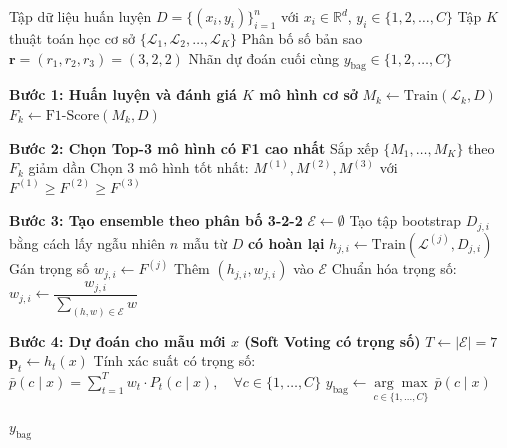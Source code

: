 
\begin{algorithm}[htbp]
\caption{Thuật toán Hybrid Bagging Ensemble Learning}
\label{bagging_ag}
\begin{algorithmic}[1]
\Require Tập dữ liệu huấn luyện $D = \{(x_i, y_i)\}_{i=1}^{n}$ với $x_i \in \mathbb{R}^d$, $y_i \in \{1, 2, \dots, C\}$
\Statex \qquad Tập $K$ thuật toán học cơ sở $\{\mathcal{L}_1, \mathcal{L}_2, \dots, \mathcal{L}_K\}$
\Statex \qquad Phân bố số bản sao $\mathbf{r} = (r_1, r_2, r_3) = (3, 2, 2)$
\Ensure Nhãn dự đoán cuối cùng $y_{\text{bag}} \in \{1, 2, \dots, C\}$

\State \textbf{Bước 1: Huấn luyện và đánh giá $K$ mô hình cơ sở}
    \State $M_k \gets \text{Train}(\mathcal{L}_k, D)$ 
    \State $F_k \gets \text{F1-Score}(M_k, D)$ 
\EndFor

\State \textbf{Bước 2: Chọn Top-3 mô hình có F1 cao nhất}
\State Sắp xếp $\{M_1, \dots, M_K\}$ theo $F_k$ giảm dần
\State Chọn 3 mô hình tốt nhất: $M^{(1)}, M^{(2)}, M^{(3)}$ với $F^{(1)} \geq F^{(2)} \geq F^{(3)}$

\State \textbf{Bước 3: Tạo ensemble theo phân bố 3-2-2}
\State $\mathcal{E} \gets \emptyset$ 
        \State Tạo tập bootstrap $D_{j,i}$ bằng cách lấy ngẫu nhiên $n$ mẫu từ $D$ \textbf{có hoàn lại}
        \State $h_{j,i} \gets \text{Train}(\mathcal{L}^{(j)}, D_{j,i})$ 
        \State Gán trọng số $w_{j,i} \gets F^{(j)}$ 
        \State Thêm $(h_{j,i}, w_{j,i})$ vào $\mathcal{E}$
    \EndFor
\EndFor
\State Chuẩn hóa trọng số: $w_{j,i} \gets \dfrac{w_{j,i}}{\sum_{(h, w) \in \mathcal{E}} w}$

\State \textbf{Bước 4: Dự đoán cho mẫu mới $x$ (Soft Voting có trọng số)}
\State $T \gets |\mathcal{E}| = 7$ 
    \State $\mathbf{p}_t \gets h_t(x)$ 
\EndFor
\State Tính xác suất có trọng số: $\bar{p}(c \mid x) = \displaystyle\sum_{t=1}^{T} w_t \cdot P_t(c \mid x), \quad \forall c \in \{1, \dots, C\}$
\State $y_{\text{bag}} \gets \underset{c \in \{1, \dots, C\}}{\arg\max} \ \bar{p}(c \mid x)$

\State \Return $y_{\text{bag}}$
\end{algorithmic}
\end{algorithm}
